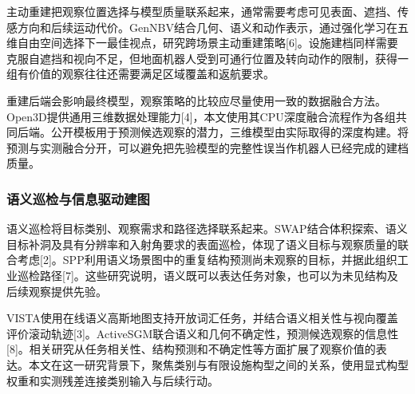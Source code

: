 \documentclass[11pt,a4paper]{article}
\numberwithin{equation}{section}
\begin{document}
主动重建把观察位置选择与模型质量联系起来，通常需要考虑可见表面、遮挡、传感方向和后续运动代价。GenNBV结合几何、语义和动作表示，通过强化学习在五维自由空间选择下一最佳视点，研究跨场景主动重建策略{[}6{]}。设施建档同样需要克服自遮挡和视向不足，但地面机器人受到可通行位置及转向动作的限制，获得一组有价值的观察往往还需要满足区域覆盖和返航要求。

重建后端会影响最终模型，观察策略的比较应尽量使用一致的数据融合方法。Open3D提供通用三维数据处理能力{[}4{]}，本文使用其CPU深度融合流程作为各组共同后端。公开模板用于预测候选观察的潜力，三维模型由实际取得的深度构建。将预测与实测融合分开，可以避免把先验模型的完整性误当作机器人已经完成的建档质量。

\hypertarget{ux8bedux4e49ux5de1ux68c0ux4e0eux4fe1ux606fux9a71ux52a8ux5efaux56fe}{%
\subsubsection{语义巡检与信息驱动建图}\label{ux8bedux4e49ux5de1ux68c0ux4e0eux4fe1ux606fux9a71ux52a8ux5efaux56fe}}

语义巡检将目标类别、观察需求和路径选择联系起来。SWAP结合体积探索、语义目标补洞及具有分辨率和入射角要求的表面巡检，体现了语义目标与观察质量的联合考虑{[}2{]}。SPP利用语义场景图中的重复结构预测尚未观察的目标，并据此组织工业巡检路径{[}7{]}。这些研究说明，语义既可以表达任务对象，也可以为未见结构及后续观察提供先验。

VISTA使用在线语义高斯地图支持开放词汇任务，并结合语义相关性与视向覆盖评价滚动轨迹{[}3{]}。ActiveSGM联合语义和几何不确定性，预测候选观察的信息性{[}8{]}。相关研究从任务相关性、结构预测和不确定性等方面扩展了观察价值的表达。本文在这一研究背景下，聚焦类别与有限设施构型之间的关系，使用显式构型权重和实测残差连接类别输入与后续行动。
\end{document}
